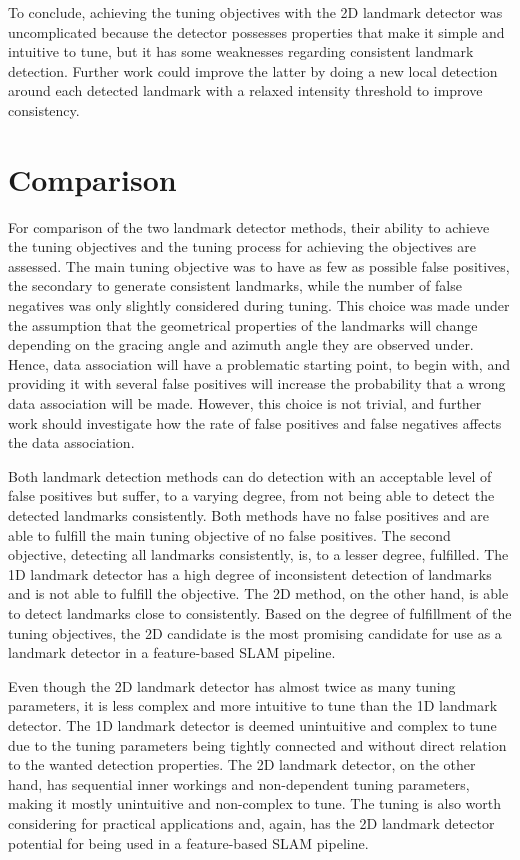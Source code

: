 To conclude, achieving the tuning objectives with the 2D landmark detector was uncomplicated because the detector possesses properties that make it simple and intuitive to tune, but it has some weaknesses regarding consistent landmark detection. Further work could improve the latter by doing a new local detection around each detected landmark with a relaxed intensity threshold to improve consistency.

\section{Comparison}

For comparison of the two landmark detector methods, their ability to achieve the tuning objectives and the tuning process for achieving the objectives are assessed. The main tuning objective was to have as few as possible false positives, the secondary to generate consistent landmarks, while the number of false negatives was only slightly considered during tuning. This choice was made under the assumption that the geometrical properties of the landmarks will change depending on the gracing angle and azimuth angle they are observed under. Hence, data association will have a problematic starting point, to begin with, and providing it with several false positives will increase the probability that a wrong data association will be made. However, this choice is not trivial, and further work should investigate how the rate of false positives and false negatives affects the data association.

Both landmark detection methods can do detection with an acceptable level of false positives but suffer, to a varying degree, from not being able to detect the detected landmarks consistently. Both methods have no false positives and are able to fulfill the main tuning objective of no false positives. The second objective, detecting all landmarks consistently, is, to a lesser degree, fulfilled. The 1D landmark detector has a high degree of inconsistent detection of landmarks and is not able to fulfill the objective. The 2D method, on the other hand, is able to detect landmarks close to consistently. Based on the degree of fulfillment of the tuning objectives, the 2D candidate is the most promising candidate for use as a landmark detector in a feature-based SLAM pipeline. 

Even though the 2D landmark detector has almost twice as many tuning parameters, it is less complex and more intuitive to tune than the 1D landmark detector. The 1D landmark detector is deemed unintuitive and complex to tune due to the tuning parameters being tightly connected and without direct relation to the wanted detection properties. The 2D landmark detector, on the other hand, has sequential inner workings and non-dependent tuning parameters, making it mostly unintuitive and non-complex to tune. The tuning is also worth considering for practical applications and, again, has the 2D landmark detector potential for being used in a feature-based SLAM pipeline. 

